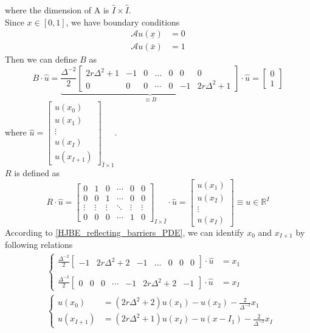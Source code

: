 \documentclass[11pt]{article}
\newcommand{\R}{\ensuremath{\mathbb{R}}}
\newcommand{\A}{\ensuremath{\mathcal{A}}}
\begin{document}
where the dimension of A is $\hat{I}\times\hat{I}$.\\
Since $x\in[0, 1]$, we have boundary conditions 
\begin{align}
\A u(\underline{x}) &= 0\\
\A u(\bar{x})& = 1
\end{align}
Then we can define $B$ as
\begin{equation}
B\cdot\hat{u} =\underbrace{\frac{\Delta^{-2}}{2}\begin{bmatrix}
2r\Delta^2+1&-1&0&\dots&0&0&0\\
0&0&0&\cdots&0&-1&2r\Delta^2+1
\end{bmatrix}}_{\equiv B}\cdot\hat{u} = \begin{bmatrix}
0\\
1
\end{bmatrix}
\end{equation}
where $\hat{u} = \begin{bmatrix}
u(x_0)\\
u(x_1)\\
\vdots\\
u(x_I)\\
u(x_{I+1})
\end{bmatrix}_{\hat{I}\times 1}$.\\
$R$ is defined as 
\begin{equation}
R\cdot \hat{u} =\begin{bmatrix}
0&1&0&\cdots&0&0\\
0&0&1&\cdots&0&0\\
\vdots&\vdots&\vdots&\ddots&\vdots&\vdots\\
0&0&0&\cdots&1&0
\end{bmatrix}_{I\times\hat{I}}\cdot \hat{u}		 
=\begin{bmatrix}
u(x_1)\\
u(x_2)\\
\vdots\\
u(x_I)
\end{bmatrix} \equiv u\in \R^{I} 
\end{equation}
According to \eqref{HJBE_reflecting_barriers_PDE}, we can identify $x_0$ and $x_{I+1}$ by following relations
\begin{align}
&\begin{cases}
\frac{\Delta^{-2}}{2}\begin{bmatrix}
-1&2r\Delta^2+2&-1&\dots&0&0&0
\end{bmatrix}\cdot \hat{u} &= x_1\\
\\[.05cm]
\frac{\Delta^{-2}}{2}\begin{bmatrix}
0&0&0&\cdots&-1&2r\Delta^2+2&-1
\end{bmatrix}\cdot \hat{u}& = x_I
\end{cases}\\
&\begin{cases}
u(x_0) &= (2r\Delta^2+2)u(x_1)-u(x_2) - \frac{2}{\Delta^{-2}}x_1\\
u(x_{I+1})&=(2r\Delta^2+1)u(x_I)-u(x-{I_1})-\frac{2}{\Delta^{-2}}x_I
\end{cases}
\end{align}
\end{document}
